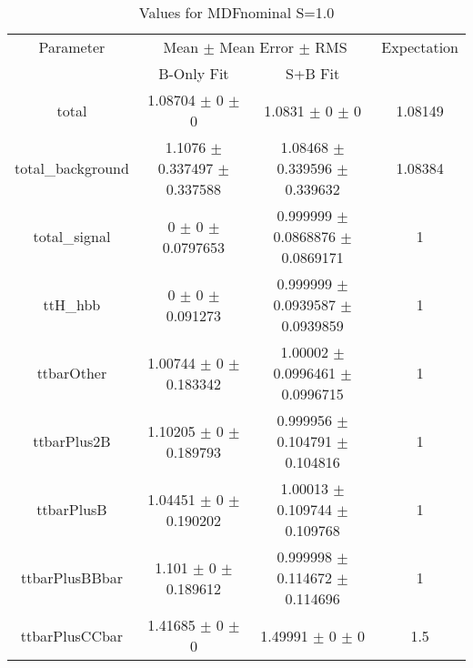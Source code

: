 \begin{table}
\centering
\caption{Values for MDFnominal S=1.0}
\begin{tabular}{cccc}
\toprule
Parameter & \multicolumn{2}{c}{Mean $\pm$ Mean Error $\pm$ RMS} & Expectation\\
 & B-Only Fit & S+B Fit & \\
\midrule
total & \num{1.08704} $\pm$ \num{0} $\pm$ \num{0} & \num{1.0831} $\pm$ \num{0} $\pm$ \num{0} & \num{1.08149}\\
total\_background & \num{1.1076} $\pm$ \num{0.337497} $\pm$ \num{0.337588} & \num{1.08468} $\pm$ \num{0.339596} $\pm$ \num{0.339632} & \num{1.08384}\\
total\_signal & \num{0} $\pm$ \num{0} $\pm$ \num{0.0797653} & \num{0.999999} $\pm$ \num{0.0868876} $\pm$ \num{0.0869171} & \num{1}\\
ttH\_hbb & \num{0} $\pm$ \num{0} $\pm$ \num{0.091273} & \num{0.999999} $\pm$ \num{0.0939587} $\pm$ \num{0.0939859} & \num{1}\\
ttbarOther & \num{1.00744} $\pm$ \num{0} $\pm$ \num{0.183342} & \num{1.00002} $\pm$ \num{0.0996461} $\pm$ \num{0.0996715} & \num{1}\\
ttbarPlus2B & \num{1.10205} $\pm$ \num{0} $\pm$ \num{0.189793} & \num{0.999956} $\pm$ \num{0.104791} $\pm$ \num{0.104816} & \num{1}\\
ttbarPlusB & \num{1.04451} $\pm$ \num{0} $\pm$ \num{0.190202} & \num{1.00013} $\pm$ \num{0.109744} $\pm$ \num{0.109768} & \num{1}\\
ttbarPlusBBbar & \num{1.101} $\pm$ \num{0} $\pm$ \num{0.189612} & \num{0.999998} $\pm$ \num{0.114672} $\pm$ \num{0.114696} & \num{1}\\
ttbarPlusCCbar & \num{1.41685} $\pm$ \num{0} $\pm$ \num{0} & \num{1.49991} $\pm$ \num{0} $\pm$ \num{0} & \num{1.5}\\
\bottomrule
\end{tabular}
\end{table}